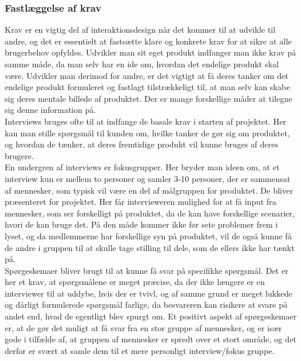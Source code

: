 \documentclass[a4paper,10pt,titlepage]{article}
\begin{document}
\subsubsection{Fastlæggelse af krav}
Krav er en vigtig del af interaktionsdesign når det kommer til at udvikle til andre, og det er essentielt at fastsætte klare og konkrete krav for at sikre at alle brugerbehov opfyldes. Udvikler man sit eget produkt indfanger man ikke krav på samme måde, da man selv har en ide om, hvordan det endelige produkt skal være. Udvikler man derimod for andre, er det vigtigt at få deres tanker om det endelige produkt formuleret og fastlagt tilstrækkeligt til, at man selv kan skabe sig deres mentale billede af produktet. Der er mange forskellige måder at tilegne sig denne information på.\\

Interviews bruges ofte til at indfange de basale krav i starten af projektet. Her kan man stille spørgsmål til kunden om, hvilke tanker de gør sig om produktet, og hvordan de tænker, at deres fremtidige produkt vil kunne bruges af deres brugere. \\
En undergren af interviews er fokusgrupper. Her bryder man ideen om, at et interview kun er mellem to personer og samler 3-10 personer, der er sammensat af mennesker, som typisk vil være en del af målgruppen for produktet. De bliver præsenteret for projektet. Her får intervieweren mulighed for at få input fra mennesker, som ser forskelligt på produktet, da de kan have forskellige scenarier, hvori de kan bruge det. På den måde kommer ikke før sete problemer frem i lyset, og da medlemmerne har forskellige syn på produktet, vil de også kunne få de andre i gruppen til at skulle tage stilling til dele, som de ellers ikke har tænkt på.\parencite{Interaction} \\

Spørgeskemaer bliver brugt til at kunne få svar på specifikke spørgsmål. Det er her et krav, at spørgsmålene er meget præcise, da der ikke længere er en interviewer til at uddybe, hvis der er tvivl, og af samme grund er meget lukkede og dårligt formulerede spørgsmål farlige, da besvareren kan risikere at svare på andet end, hvad de egentligt blev spurgt om. Et positivt aspekt af spørgeskemaer er, at de gør det muligt at få svar fra en stor gruppe af mennesker, og er især gode i tilfælde af, at gruppen af mennesker er spredt over et stort område, og det derfor er svært at samle dem til et mere personligt interview/fokus gruppe. \parencite{Interaction}
\end{document}
